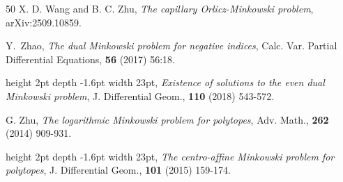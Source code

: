\documentclass[11pt]{amsart}
\numberwithin{equation} {section}
\numberwithin{equation}{section}
\begin{document}
\begin{thebibliography}{50}
X. D. Wang and B. C. Zhu, \emph{The capillary Orlicz-Minkowski problem}, arXiv:2509.10859.

Y.~Zhao, \emph{The dual Minkowski problem for negative indices}, Calc. Var. Partial Differential Equations, {\bf 56} (2017) 56:18.

\leavevmode\vrule height 2pt depth -1.6pt width 23pt, \emph{Existence of solutions to the even dual Minkowski problem}, J. Differential Geom., {\bf 110} (2018) 543-572.

G. Zhu, \emph{The logarithmic Minkowski problem for polytopes}, Adv.
  Math., {\bf 262} (2014) 909-931.

\leavevmode\vrule height 2pt depth -1.6pt width 23pt, \emph{The centro-affine Minkowski problem for polytopes}, J. Differential Geom., {\bf 101} (2015) 159-174.


\end{thebibliography}
\end{document}
